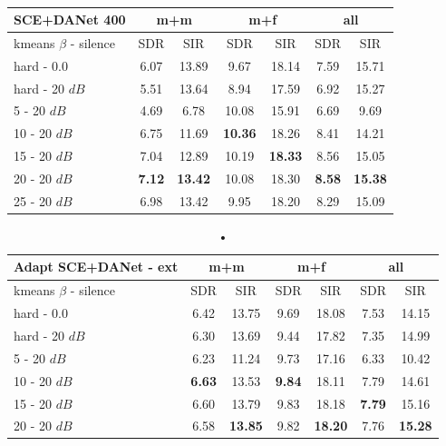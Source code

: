 \documentclass[master, tikz, final,11pt, dvipdfmx]{iscs-thesis}
\begin{document}
\begin{table}[h!]
\centering
\begin{tabular}{l|c|c|c|c|c|c}
SCE+DANet 400 & \multicolumn{2}{c|}{m+m} & \multicolumn{2}{c|}{m+f} & \multicolumn{2}{c}{all} \\ 
\hline 
kmeans $\beta$ - silence & SDR & SIR & SDR & SIR & SDR & SIR \\ 
\hline
hard - 0.0  & 6.07 & 13.89 & 9.67 & 18.14 & 7.59 & 15.71 \\ 
hard - 20 $dB$  & 5.51 & 13.64 & 8.94 & 17.59 & 6.92 & 15.27 \\
\hline
\hline
5 - 20 $dB$  & 4.69 & 6.78 & 10.08 & 15.91 & 6.69 & 9.69 \\ 
10 - 20 $dB$  & 6.75 & 11.69 & \cellcolor{green}\textbf{10.36} & \cellcolor{green}18.26  & 8.41 & 14.21 \\ 
15 - 20 $dB$ & 7.04 & 12.89 & 10.19 & \textbf{18.33} & 8.56 & 15.05 \\ 
20 - 20 $dB$ & \cellcolor{green}\textbf{7.12} & \cellcolor{green}\textbf{13.42} & 10.08 & 18.30 & \cellcolor{green}\textbf{8.58} & \cellcolor{green}\textbf{15.38} \\ 
25 - 20 $dB$ & 6.98 & 13.42 & 9.95 & 18.20 & 8.29 & 15.09 \\ 
\end{tabular}
\captionsetup{justification=centering}
\caption{}
\label{table:SCEDANET400}
\end{table}

\begin{table}[h!]
\centering
\begin{tabular}{l|c|c|c|c|c|c}
Adapt SCE+DANet - ext & \multicolumn{2}{c|}{m+m} & \multicolumn{2}{c|}{m+f} & \multicolumn{2}{c}{all} \\ 
\hline 
kmeans $\beta$ - silence & SDR & SIR & SDR & SIR & SDR & SIR \\ 
\hline
hard - 0.0  & 6.42 & 13.75 & 9.69 & 18.08 & 7.53 & 14.15 \\ 
hard - 20 $dB$  & 6.30 & 13.69 & 9.44 & 17.82 & 7.35 & 14.99 \\
\hline
\hline
5 - 20 $dB$  & 6.23 & 11.24 & 9.73 & 17.16 & 6.33 & 10.42 \\ 
10 - 20 $dB$  & \cellcolor{green}\textbf{6.63} & \cellcolor{green}13.53 & \cellcolor{green}\textbf{9.84} & \cellcolor{green}18.11 & 7.79 & 14.61 \\ 
15 - 20 $dB$ & 6.60 & 13.79 & 9.83 & 18.18 & \cellcolor{green}\textbf{7.79} & \cellcolor{green}15.16 \\ 
20 - 20 $dB$ & 6.58 & \textbf{13.85} & 9.82 & \textbf{18.20} & 7.76 & \textbf{15.28} \\ 
\end{tabular}
\caption{•}
\label{table:AdaptSCEDANET400}
\end{table}
\end{document}
